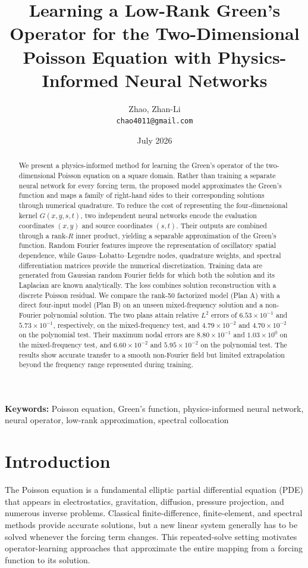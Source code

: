 \documentclass[11pt,a4paper]{article}
\title{Learning a Low-Rank Green's Operator for the Two-Dimensional Poisson Equation with Physics-Informed Neural Networks}
\author{Zhao, Zhan-Li\\
\texttt{chao4011@gmail.com}}
\date{July 2026}
\begin{document}
\maketitle

\begin{abstract}
We present a physics-informed method for learning the Green's operator of the two-dimensional Poisson equation on a square domain. Rather than training a separate neural network for every forcing term, the proposed model approximates the Green's function and maps a family of right-hand sides to their corresponding solutions through numerical quadrature. To reduce the cost of representing the four-dimensional kernel $G(x,y,s,t)$, two independent neural networks encode the evaluation coordinates $(x,y)$ and source coordinates $(s,t)$. Their outputs are combined through a rank-$R$ inner product, yielding a separable approximation of the Green's function. Random Fourier features improve the representation of oscillatory spatial dependence, while Gauss--Lobatto--Legendre nodes, quadrature weights, and spectral differentiation matrices provide the numerical discretization. Training data are generated from Gaussian random Fourier fields for which both the solution and its Laplacian are known analytically. The loss combines solution reconstruction with a discrete Poisson residual. We compare the rank-50 factorized model (Plan A) with a direct four-input model (Plan B) on an unseen mixed-frequency solution and a non-Fourier polynomial solution. The two plans attain relative $L^2$ errors of $6.53\times10^{-1}$ and $5.73\times10^{-1}$, respectively, on the mixed-frequency test, and $4.79\times10^{-2}$ and $4.70\times10^{-2}$ on the polynomial test. Their maximum nodal errors are $8.80\times10^{-1}$ and $1.03\times10^{0}$ on the mixed-frequency test, and $6.60\times10^{-2}$ and $5.95\times10^{-2}$ on the polynomial test. The results show accurate transfer to a smooth non-Fourier field but limited extrapolation beyond the frequency range represented during training.
\end{abstract}

\noindent\textbf{Keywords:} Poisson equation, Green's function, physics-informed neural network, neural operator, low-rank approximation, spectral collocation

\section{Introduction}

The Poisson equation is a fundamental elliptic partial differential equation (PDE) that appears in electrostatics, gravitation, diffusion, pressure projection, and numerous inverse problems. Classical finite-difference, finite-element, and spectral methods provide accurate solutions, but a new linear system generally has to be solved whenever the forcing term changes. This repeated-solve setting motivates operator-learning approaches that approximate the entire mapping from a forcing function to its solution.
\end{document}
